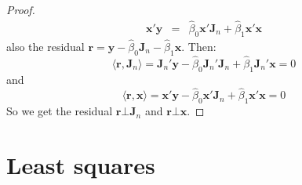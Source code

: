 \documentclass[12pt]{article}
\begin{document}
\begin{enumerate}
\begin{proof}
\begin{eqnarray}
            \textbf{x}'\textbf{y} &=& \hat{\beta}_0 \textbf{x}'\textbf{J}_n + \hat{\beta}_1 \textbf{x}'\textbf{x}
        \end{eqnarray} 
    also the residual $\textbf{r} = \textbf{y} - \hat{\beta}_0 \textbf{J}_n - \hat{\beta}_1 \textbf{x}$.
    Then: 
    $$\langle \textbf{r}, \textbf{J}_n \rangle = \textbf{J}_n'\textbf{y} - \hat{\beta}_0 \textbf{J}_n'\textbf{J}_n + \hat{\beta}_1 \textbf{J}_n'\textbf{x} = 0$$
    and
    $$\langle \textbf{r}, \textbf{x} \rangle = \textbf{x}'\textbf{y} - \hat{\beta}_0 \textbf{x}'\textbf{J}_n + \hat{\beta}_1 \textbf{x}'\textbf{x} = 0$$
    So we get the residual $\textbf{r} \bot \textbf{J}_n$ and $\textbf{r} \bot \textbf{x}$.
    \end{proof}
\end{enumerate}

\section{Least squares}
\end{document}
